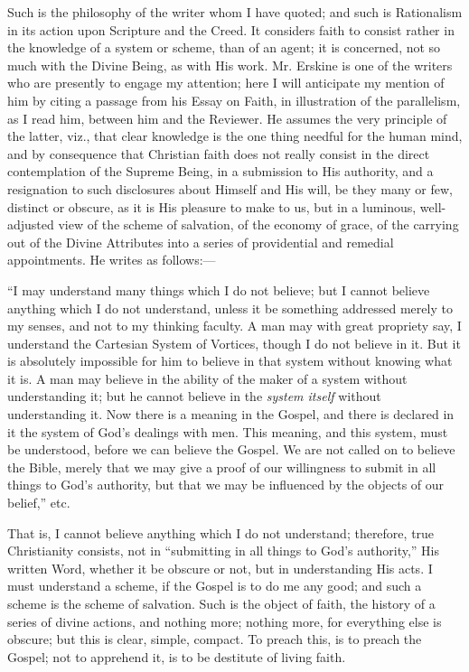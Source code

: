 Such is the philosophy of the writer whom I have
quoted; and such is Rationalism in its action upon Scripture and the
Creed. It considers faith to consist rather in the knowledge of a
system or scheme, than of an agent; it is concerned, not so much with
the Divine Being, as with His work. Mr. Erskine is one of the writers
who are presently to engage my attention; here I will anticipate my
mention of him by citing a passage from his Essay on Faith, in
illustration of the parallelism, as I read him, between him and the
Reviewer. He assumes the very principle of the latter, viz., that
clear knowledge is the one thing needful for the human mind, and by
consequence that Christian faith does not really consist in the direct
contemplation of the Supreme Being, in a submission to His authority,
and a resignation to such disclosures about Himself and His will, be
they many or few, distinct or obscure, as it is His pleasure to make
to us, but in a luminous, well-adjusted view of the scheme of
salvation, of the economy of grace, of the carrying out of the Divine
Attributes into a series of providential and remedial appointments. He
writes as follows:—

``I may
understand many things which I do not believe; but I cannot believe
anything which I do not understand, unless it be something addressed
merely to my senses, and not to my thinking faculty. A man may with
great propriety say, I understand the Cartesian System of Vortices,
though I do not believe in it. But it is absolutely impossible for him
to believe in that system without knowing what it is. A man may
believe in the ability of the maker of a system without understanding
it; but he cannot believe in the \emph{system
itself} without understanding
it. Now there is a meaning in the Gospel, and there is declared in it
the system of God's dealings with men. This meaning, and this system,
must be understood, before we can believe the Gospel. We are not
called on to believe the Bible, merely that we may give a proof of our
willingness to submit in all things to God's authority, but that we
may be influenced by the objects of our belief,'' etc.

That is, I cannot believe anything which I do not
understand; therefore, true Christianity consists, not in ``submitting in all things to God's authority,'' His written Word,
whether it be obscure or not, but in understanding His acts. I must
understand a scheme, if the Gospel is to do me any good; and such a
scheme is the scheme of salvation. Such is the object of faith, the
history of a series of divine actions, and nothing more; nothing more,
for everything else is obscure; but this is clear, simple, compact. To
preach this, is to preach the Gospel; not to apprehend it, is to be
destitute of living faith.

